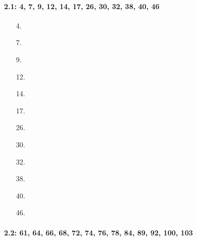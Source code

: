 \documentclass[10pt, letterpaper]{article}
\begin{document}
    \iffalse
    \begin{equation*}
        \begin{gathered}
            Equations go here.
        \end{gathered}
    \end{equation*}

    \resizebox{\hsize}{!}{$Long equation goes here$}

    \begin{multicol*}{# of columns}
    \end{multicol*}

    \horizontal

    \fi


    \paragraph*{2.1: 4, 7, 9, 12, 14, 17, 26, 30, 32, 38, 40, 46}

    \begin{itemize}
        \item [4.]
        \begin{mdframed}
            
        \end{mdframed}
        
        \item [7.]
        \item [9.]
        \item [12.]
        \item [14.]
        \item [17.]
        \item [26.]
        \item [30.]
        \item [32.]
        \item [38.]
        \item [40.]
        \item [46.]
    \end{itemize}

    \paragraph*{2.2: 61, 64, 66, 68, 72, 74, 76, 78, 84, 89, 92, 100, 103}
    
\end{document}
